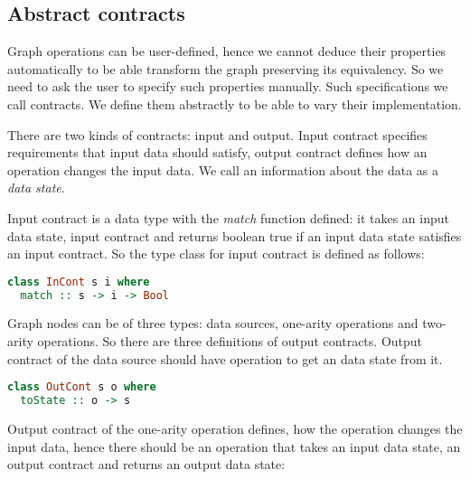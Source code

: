 
\subsection{Abstract contracts}


Graph operations can be user-defined, hence we cannot deduce their properties automatically to be able transform the graph preserving its equivalency.
So we need to ask the user to specify such properties manually.
Such specifications we call contracts.
We define them abstractly to be able to vary their implementation.

There are two kinds of contracts: input and output.
Input contract specifies requirements that input data should satisfy, output contract defines how an operation changes the input data.
We call an information about the data as a {\em data state}.

Input contract is a data type with the {\em match} function defined: it takes an input data state, input contract and returns boolean true if an input data state satisfies an input contract.
So the type class for input contract is defined as follows:

\begin{lstlisting}[language=Haskell]
class InCont s i where
  match :: s -> i -> Bool
\end{lstlisting}

Graph nodes can be of three types: data sources, one-arity operations and two-arity operations.
So there are three definitions of output contracts.
Output contract of the data source should have operation to get an data state from it.

\begin{lstlisting}[language=Haskell]
class OutCont s o where
  toState :: o -> s
\end{lstlisting}

Output contract of the one-arity operation defines, how the operation changes the input data, hence there should be an operation that takes an input data state, an output contract and returns an output data state:

